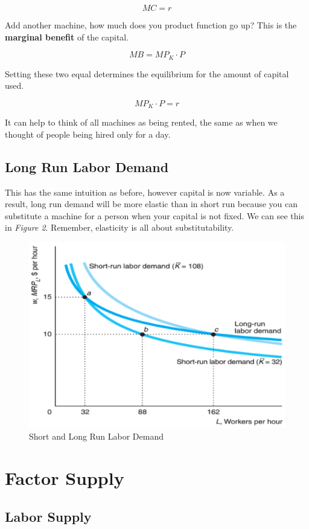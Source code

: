 \documentclass{article}
\begin{document}
$$MC=r$$

Add another machine, how much does you product function go up? This is the \textbf{marginal benefit} of the capital.

$$MB=MP_{K}\cdot P$$

Setting these two equal determines the equilibrium for the amount of capital used.

$$MP_{K}\cdot P=r$$

It can help to think of all machines as being rented, the same as when we thought of people being hired only for a day. 

\subsection{Long Run Labor Demand}

This has the same intuition as before, however capital is now variable. As a result, long run demand will be more elastic than in short run because you can substitute a machine for a person when your capital is not fixed. We can see this in \textit{Figure 2}. Remember, elasticity is all about substitutability. 

\begin{figure}[H]
    \centering
    \includegraphics[scale=0.33]{"Figure 16-2"}
    \caption{Short and Long Run Labor Demand}
\end{figure}

\section{Factor Supply}

\subsection{Labor Supply}
\end{document}
